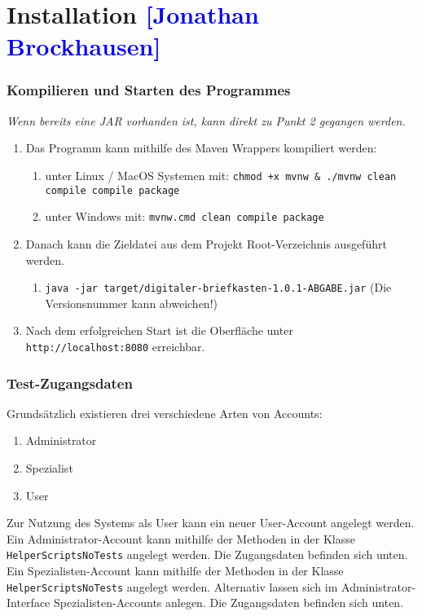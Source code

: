 

\section{Installation \textcolor{blue}{[Jonathan Brockhausen]}}
\label{instal}

\subsubsection*{Kompilieren und Starten des Programmes}
\textit{Wenn bereits eine JAR vorhanden ist, kann direkt zu Punkt 2 gegangen werden.}
\begin{enumerate}
	\item{Das Programm kann mithilfe des Maven Wrappers kompiliert werden:}
	\begin{enumerate}
		\item{unter Linux / MacOS Systemen mit: \texttt{chmod +x mvnw \& ./mvnw clean compile compile package}}
		\item{unter Windows mit: \texttt{mvnw.cmd clean compile package}}
	\end{enumerate}
	\item{Danach kann die Zieldatei aus dem Projekt Root-Verzeichnis ausgeführt werden.}
	\begin{enumerate}
		\item{\texttt{java -jar target/digitaler-briefkasten-1.0.1-ABGABE.jar} (Die Versionsnummer kann abweichen!)}
	\end{enumerate}
	\item{Nach dem erfolgreichen Start ist die Oberfläche unter \texttt{http://localhost:8080} erreichbar.}
\end{enumerate}

\subsubsection*{Test-Zugangsdaten}
Grundsätzlich existieren drei verschiedene Arten von Accounts:
\begin{enumerate}
	\item{Administrator}
	\item{Spezialist}
	\item{User}
\end{enumerate}

Zur Nutzung des Systems als User kann ein neuer User-Account angelegt werden.\\
Ein Administrator-Account kann mithilfe der Methoden in der Klasse \texttt{HelperScriptsNoTests} angelegt werden. Die Zugangsdaten befinden sich unten.\\
Ein Spezialisten-Account kann mithilfe der Methoden in der Klasse \texttt{HelperScriptsNoTests} angelegt werden. Alternativ lassen sich im Administrator-Interface Spezialisten-Accounts anlegen. Die Zugangsdaten befinden sich unten.


